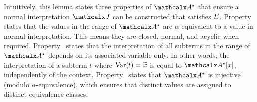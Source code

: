 \pagebreak[2]

Intuitively, this lemma states three properties of $\ValC$ that ensure a normal
interpretation $\J$ can be constructed that satisfies $E$. Property~ states that the
values in the range of $\ValC$ are $\alpha$-equivalent to a value in normal
interpretation. This means they are closed, normal, and acyclic when
required. Property~ states that the interpretation of all subterms in the
range of $\ValC$ depends on its associated variable only. In other words, the
interpretation of a subterm $t$ where $\muvar(t) = {\Varec{x}}$ is equal to
$\ValC \ec{x}$, independently of the context. %
Property~ states that $\ValC$ is injective (modulo
$\alpha$-equivalence), which ensures %
that distinct values are
assigned to distinct equivalence classes.

